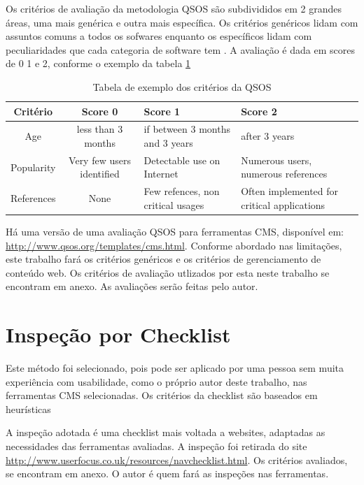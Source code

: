 Os critérios de avaliação da metodologia QSOS são subdivididos em 2 grandes áreas, uma mais genérica e outra mais específica. Os critérios genéricos lidam com assuntos comuns a todos os sofwares enquanto os específicos lidam com peculiaridades que cada categoria de software tem \cite{openbrr_qsos}. A avaliação é dada em scores de 0 1 e 2, conforme o exemplo da tabela \ref{table:qsos_avaliacao}  

\begin{table}[ht]
\caption{Tabela de exemplo dos critérios da QSOS } %
\centering %
\begin{tabular}{c | c | p{4.2cm} | p{4.2cm}} %
\hline\hline %
Critério & Score 0 & Score 1 & Score 2  \\ [0.5ex] %
\hline %
Age        & less than 3 months  & if between 3 months and 3 years   & after 3 years    \\ \hline
Popularity & Very few users identified  & Detectable use on Internet & Numerous users, numerous references    \\ \hline
References & None   & Few refences, non critical usages  & Often implemented for critical applications \\ [1ex] %
\hline %
\end{tabular}
\label{table:qsos_avaliacao} %
\end{table}

Há uma versão de uma avaliação QSOS para ferramentas CMS, disponível em: \url{http://www.qsos.org/templates/cms.html}. Conforme abordado nas limitações, este trabalho fará os critérios genéricos e os critérios de gerenciamento de conteúdo web. Os critérios de avaliação utlizados por esta neste trabalho se encontram em anexo. As avaliações serão feitas pelo autor.

\section{Inspeção por Checklist}

Este método foi selecionado, pois pode ser aplicado por uma pessoa sem muita experiência com usabilidade, como o próprio autor deste trabalho, nas ferramentas CMS selecionadas. Os critérios da checklist são baseados em heurísticas

A inspeção adotada é uma checklist mais voltada a websites, adaptadas as necessidades das ferramentas avaliadas. A inspeção foi retirada do site \url{http://www.userfocus.co.uk/resources/navchecklist.html}. Os critérios avaliados, se encontram em anexo. O autor é quem fará as inspeções nas ferramentas.


